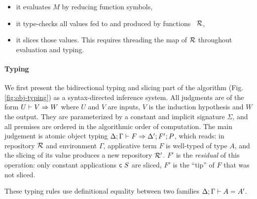 \documentclass{llncs}
\begin{document}
\begin{itemize}
\item it evaluates $M$ by reducing function symbols,
\item it type-checks all values fed to and produced by functions \wrt\
  $\mathcal{R}$,
\item it slices those values. This requires threading the map of $\mathcal{R}$
  throughout evaluation and typing.
\end{itemize}

\paragraph{Typing}

We first present the bidirectional typing and slicing part of the
algorithm (Fig. \ref{fig:obj-typing}) as a syntax-directed inference
system. All judgments are of the form ${U}\vdash{{V}\Rightarrow{W}}$ where $U$ and $V$
are inputs, $V$ is the induction hypothesis and $W$ the output. They
are parameterized by a constant and implicit signature $\Sigma$, and
all premises are ordered in the algorithmic order of computation. The
main judgement is atomic object typing ${{\Delta}; {\Gamma}}\vdash{{{F}}\Rightarrow{{\Delta'};{F'};{P}}}$, which reads: in repository $\mathcal{R}$ and environment $\Gamma$,
applicative term $F$ is well-typed of type $A$, and the slicing of its
value produces a new repository $\mathcal{R'}$. $F'$ is the \emph{residual} of
this operation: only constant applications ${\text{\textsf{c}}}\  S$ are
sliced, $F'$ is the ``tip'' of $F$ that was not sliced.

These typing rules use definitional equality between two families
${{\Delta}; {\Gamma}}\vdash{{A}={A'}}$.
\end{document}
